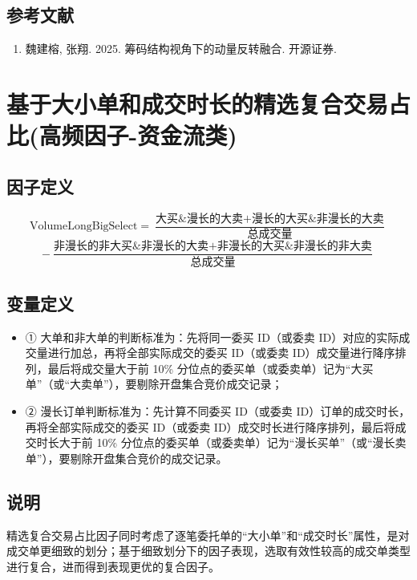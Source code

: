 \documentclass{article}
\begin{document}
\subsection{参考文献}
\begin{enumerate}
    \item 魏建榕, 张翔. 2025. 筹码结构视角下的动量反转融合. 开源证券.
\end{enumerate}

\section{基于大小单和成交时长的精选复合交易占比(高频因子-资金流类)}

\subsection{因子定义}
\begin{equation}
    \mathrm{VolumeLongBigSelect} = \frac{\text{大买\&漫长的大卖} + \text{漫长的大买\&非漫长的大卖}}{\text{总成交量}} 
\end{equation}   
\begin{equation}
    - \frac{\text{非漫长的非大买\&非漫长的大卖} + \text{非漫长的大买\&非漫长的非大卖}}{\text{总成交量}}
\end{equation}

\subsection{变量定义}
\begin{itemize}
    \item ① 大单和非大单的判断标准为：先将同一委买 ID（或委卖 ID）对应的实际成交量进行加总，再将全部实际成交的委买 ID（或委卖 ID）成交量进行降序排列，最后将成交量大于前 10\% 分位点的委买单（或委卖单）记为“大买单”（或“大卖单”），要剔除开盘集合竞价成交记录；
    \item ② 漫长订单判断标准为：先计算不同委买 ID（或委卖 ID）订单的成交时长，再将全部实际成交的委买 ID（或委卖 ID）成交时长进行降序排列，最后将成交时长大于前 10\% 分位点的委买单（或委卖单）记为“漫长买单”（或“漫长卖单”），要剔除开盘集合竞价的成交记录。
\end{itemize}

\subsection{说明}
精选复合交易占比因子同时考虑了逐笔委托单的“大小单”和“成交时长”属性，是对成交单更细致的划分；基于细致划分下的因子表现，选取有效性较高的成交单类型进行复合，进而得到表现更优的复合因子。
\end{document}
